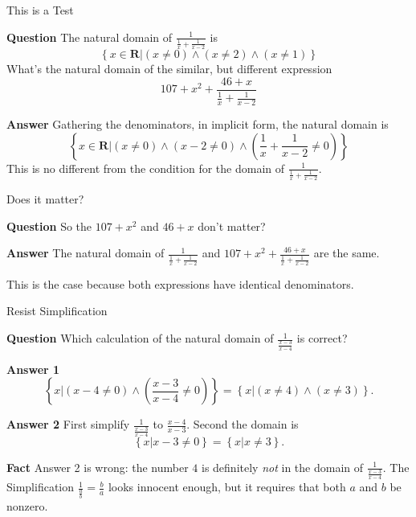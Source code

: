 \documentclass[usenames,dvipsnames,fleqn,leqno,10pt, pdflatex]{beamer}
\newcommand{\reals}{\mathbf{R}}
\begin{document}
\begin{frame}{This is a Test}

\textbf{Question} The natural domain of 
\(\frac{1}{\frac{1}{x} + \frac{1}{x-2}} \) is 
\begin{equation*}
    \left\{ x \in \reals \bigg | \left(x \neq 0\right)  
    \land \left(x  \neq 2 \right) \land  
    \left(x \neq 1 \right) \right\}
\end{equation*}
What's the natural domain of the similar, but different expression   
\begin{equation*}
    107 + x^2 + \frac{46 + x}{\frac{1}{x} + \frac{1}{x-2}} 
\end{equation*}  

\textbf{Answer} Gathering the denominators, in implicit form, the
natural domain is
\begin{equation*}
    \left\{ x \in \reals \bigg | \left(x \neq 0 \right)  
    \land \left(x-2 \neq 0 \right) \land  
    \left(\frac{1}{x} + \frac{1}{x-2} \neq 0 \right) \right\}
\end{equation*}
This is no different from the condition for the domain of 
\(\frac{1}{\frac{1}{x} + \frac{1}{x-2}}\).

\end{frame}

\begin{frame}{Does it matter?}

\textbf{Question} So the \(107 + x^2\) and \(46 + x\) don't matter?

\textbf{Answer} The natural domain of \(\frac{1}{\frac{1}{x} + \frac{1}{x-2}} \)
and \( 107 + x^2 + \frac{46 + x}{\frac{1}{x} + \frac{1}{x-2}}  \) are
the same. 

This is the case because both expressions have identical denominators.

\vfill

\end{frame}

\begin{frame}{Resist Simplification}

\textbf{Question} Which calculation of the natural domain
of  \(\frac{1}{\frac{x-3}{x-4}} \) is correct?

\textbf{Answer 1}
\[
  \left  \{ x \big | \left(x-4 \neq 0\right) \land  
      \left(\frac{x-3}{x-4} \neq 0 \right) \right \} =
      \left \{ x \big | \left(x \neq 4 \right) \land  
      \left(x \neq 3 \right) \right \}.
\]

\textbf{Answer 2} First simplify \(\frac{1}{\frac{x-3}{x-4}} \) to
\(\frac{x-4}{x-3} \). Second the domain is
\[
    \left \{ x \big | x-3 \neq 0  \right \} =
       \left \{ x \big | x \neq 3  \right \}.
 \]

 \textbf{Fact} Answer 2 is wrong: the number $4$ is definitely 
 \emph{not} in the domain of \(\frac{1}{\frac{x-3}{x-4}} \). The Simplification
 \(\frac{1}{\frac{a}{b}} = \frac{b}{a}\) looks innocent enough, but
 it requires that both $a$ and $b$ be nonzero.

\end{frame}
\end{document}
